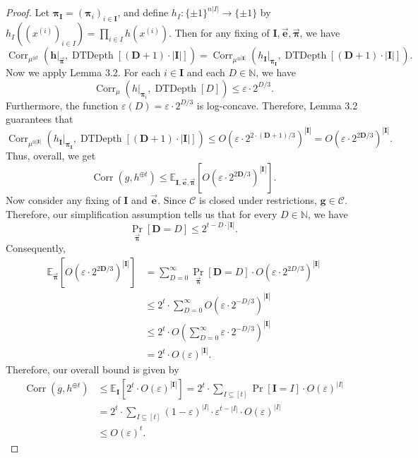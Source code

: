 \documentclass[10pt,a4paper]{article}
\newcommand{\Corr}{\operatorname{Corr}}
\newcommand{\DT}{\operatorname{DTDepth}}
\begin{document}
\begin{proof}
Let $\boldsymbol\pi_{\mathbf I}=(\boldsymbol\pi_i)_{i\in\mathbf I}$, and define $h_I:\{\pm1\}^{n|I|}\to\{\pm1\}$ by $h_I((x^{(i)})_{i\in I})=\prod_{i\in I}h(x^{(i)})$. Then for any fixing of $\mathbf I,\vec{\mathbf e},\vec{\boldsymbol\pi}$, we have
\[\Corr_{\mu^{\otimes t}}(\mathbf h|_{\vec{\boldsymbol\pi}},\DT[(\mathbf D+1)\cdot|\mathbf I|])=\Corr_{\mu^{\otimes|\mathbf I|}}(h_{\mathbf I}|_{\boldsymbol\pi_{\mathbf I}},\DT[(\mathbf D+1)\cdot|\mathbf I|]).\]
Now we apply Lemma 3.2. For each $i\in\mathbf I$ and each $D\in\mathbb N$, we have
\[\Corr_\mu(h|_{\boldsymbol\pi_i},\DT[D])\le\varepsilon\cdot2^{D/3}.\]
Furthermore, the function $\varepsilon(D)=\varepsilon\cdot2^{D/3}$ is log-concave. Therefore, Lemma 3.2 guarantees that
\[\Corr_{\mu^{\otimes|\mathbf I|}}(h_{\mathbf I}|_{\boldsymbol\pi_{\mathbf I}},\DT[(\mathbf D+1)\cdot|\mathbf I|])\le O(\varepsilon\cdot2^{2\cdot(\mathbf D+1)/3})^{|\mathbf I|}=O(\varepsilon\cdot2^{2\mathbf D/3})^{|\mathbf I|}.\]
Thus, overall, we get
\[\Corr(g,h^{\oplus t})\le\mathbb E_{\mathbf I,\vec{\mathbf e},\vec{\boldsymbol\pi}}\left[O\left(\varepsilon\cdot2^{2\mathbf D/3}\right)^{|\mathbf I|}\right].\]
Now consider any fixing of $\mathbf I$ and $\vec{\mathbf e}$. Since $\mathcal C$ is closed under restrictions, $\mathbf g\in\mathcal C$. Therefore, our simplification assumption tells us that for every $D\in\mathbb N$, we have
\[\Pr_{\vec{\boldsymbol\pi}}[\mathbf D=D]\le2^{t-D\cdot|\mathbf I|}.\]
Consequently,
\begin{align*}
\mathbb E_{\vec{\boldsymbol\pi}}\left[O\left(\varepsilon\cdot2^{2\mathbf D/3}\right)^{|\mathbf I|}\right]&=\sum_{D=0}^\infty\Pr_{\vec{\boldsymbol\pi}}[\mathbf D=D]\cdot O\left(\varepsilon\cdot2^{2D/3}\right)^{|\mathbf I|}\\
&\le2^t\cdot\sum_{D=0}^\infty O\left(\varepsilon\cdot2^{-D/3}\right)^{|\mathbf I|}\\
&\le2^t\cdot O\left(\sum_{D=0}^\infty\varepsilon\cdot2^{-D/3}\right)^{|\mathbf I|}\\
&=2^t\cdot O(\varepsilon)^{|\mathbf I|}.
\end{align*}
Therefore, our overall bound is given by
\begin{align*}
\Corr(g,h^{\oplus t})&\le\mathbb E_{\mathbf I}[2^t\cdot O(\varepsilon)^{|\mathbf I|}]=2^t\cdot\sum_{I\subseteq[t]}\Pr[\mathbf I=I]\cdot O(\varepsilon)^{|I|}\\
&=2^t\cdot\sum_{I\subseteq[t]}(1-\varepsilon)^{|I|}\cdot\varepsilon^{t-|I|}\cdot O(\varepsilon)^{|I|}\\
&\le O(\varepsilon)^t.
\end{align*}
\end{proof}
\end{document}
